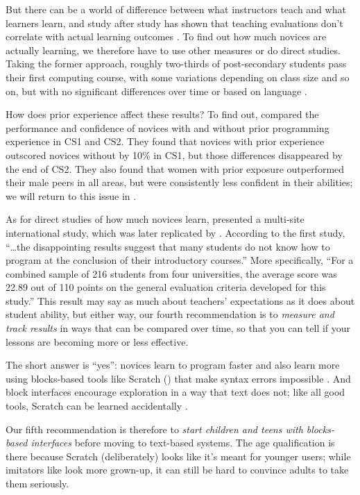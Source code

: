 But there can be a world of difference between what instructors teach
and what learners learn, and study after study has shown that teaching
evaluations don't correlate with actual learning outcomes
\cite{Star2014,Uttl2017}. To find out how much novices are actually
learning, we therefore have to use other measures or do direct studies.
Taking the former approach, roughly two-thirds of post-secondary
students pass their first computing course, with some variations
depending on class size and so on, but with no significant differences
over time or based on language \cite{Benn2007a,Wats2014}.

How does prior experience affect these results? To find out,
\cite{Wilc2018} compared the performance and confidence of novices
with and without prior programming experience in CS1 and CS2. They found
that novices with prior experience outscored novices without by 10\% in
CS1, but those differences disappeared by the end of CS2. They also
found that women with prior exposure outperformed their male peers in
all areas, but were consistently less confident in their abilities; we
will return to this issue in .

As for direct studies of how much novices learn, \cite{McCr2001}
presented a multi-site international study, which was later replicated
by \cite{Utti2013}. According to the first study, ``{\ldots}the
disappointing results suggest that many students do not know how to
program at the conclusion of their introductory courses.'' More
specifically, ``For a combined sample of 216 students from four
universities, the average score was 22.89 out of 110 points on the
general evaluation criteria developed for this study.'' This result may
say as much about teachers' expectations as it does about student
ability, but either way, our fourth recommendation is to \emph{measure and
track results} in ways that can be compared over time, so that you can
tell if your lessons are becoming more or less effective.


The short answer is ``yes'': novices learn to program faster and also
learn more using blocks-based tools like Scratch
() that make syntax errors impossible
\cite{Wein2017b}. And block interfaces encourage exploration in a way
that text does not; like all good tools, Scratch can be learned
accidentally \cite{Malo2010}.

Our fifth recommendation is therefore to \emph{start children and teens
with blocks-based interfaces} before moving to text-based systems. The
age qualification is there because Scratch (deliberately) looks like
it's meant for younger users; while imitators like 
look more grown-up, it can still be hard to convince adults to take
them seriously.

